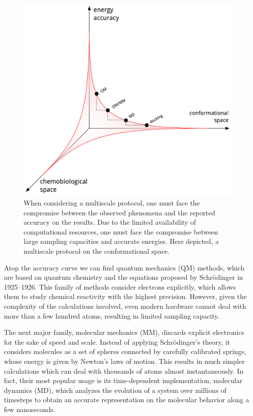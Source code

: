 \begin{figure}
		\includegraphics[width=\textwidth]{./figures/01/thong.pdf}
		\cprotect\caption[Accuracy vs accessible space in multiscale modeling]{When considering a multiscale protocol, one must face the compromise between the observed phenomena and the reported accuracy on the results. Due to the limited availability of computational resources, one must face the compromise between large sampling capacities and accurate energies. Here depicted, a multiscale protocol on the conformational space.}
		\label{fig:multiscalethong}
\end{figure}


Atop the accuracy curve we can find quantum mechanics (QM) methods, which are based on quantum chemistry and the equations proposed by Schrödinger in 1925--1926.\cite{schrodinger} This family of methods consider electrons explicitly, which allows them to study chemical reactivity with the highest precision. However, given the complexity of the calculations involved, even modern hardware cannot deal with more than a few hundred atoms, resulting in limited sampling capacity.

The next major family, molecular mechanics (MM), discards explicit electronics for the sake of speed and scale. Instead of applying Schrödinger's theory, it considers molecules as a set of spheres connected by carefully calibrated springs, whose energy is given by Newton's laws of motion. This results in much simpler calculations which can deal with thousands of atoms almost instantaneously. In fact, their most popular usage is its time-dependent implementation, molecular dynamics (MD), which analyzes the evolution of a system over millions of timesteps to obtain an accurate representation on the molecular behavior along a few nanoseconds.

